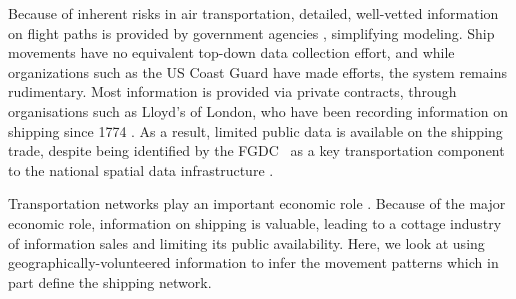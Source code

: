 Because of inherent risks in air transportation, detailed, well-vetted information on flight paths is provided by government agencies \citep{guimera2005worldwide}, simplifying modeling. Ship movements have no equivalent top-down data collection effort, and while organizations such as the US Coast Guard have made efforts, the system remains rudimentary. Most information is provided via private contracts, through organisations such as Lloyd's of London, who have been recording information on shipping since 1774 \citep{Lloyd'sRegister-FairplayLtd.2010}. As a result, limited public data is available on the shipping trade, despite being identified by the FGDC~\citep{FGDC} as a key transportation component to the national spatial data infrastructure \citep{CurrierInPress}.

Transportation networks play an important economic role \citep{canning1993effects}. Because of the major economic role, information on shipping is valuable, leading to a cottage industry of information sales and limiting its public availability. Here, we look at using geographically-volunteered information to infer the movement patterns which in part define the shipping network.




